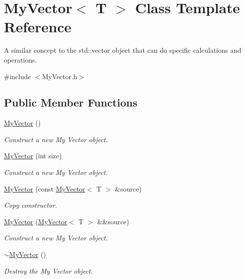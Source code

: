 \hypertarget{class_my_vector}{}\section{My\+Vector$<$ T $>$ Class Template Reference}
\label{class_my_vector}


A similar concept to the std\+::vector object that can do specific calculations and operations.  




{\ttfamily \#include $<$My\+Vector.\+h$>$}

\subsection*{Public Member Functions}
\begin{DoxyCompactItemize}
\item 
\mbox{\hyperlink{class_my_vector_ac356762c5ced52c0d934476cef32e472}{My\+Vector}} ()
\begin{DoxyCompactList}\small\item\em Construct a new My Vector object. \end{DoxyCompactList}\item 
\mbox{\hyperlink{class_my_vector_a9f780e2c6c6f35610a656b64395c6d1b}{My\+Vector}} (int size)
\begin{DoxyCompactList}\small\item\em Construct a new My Vector object. \end{DoxyCompactList}\item 
\mbox{\hyperlink{class_my_vector_aaf93995f4a267cc279867c10cfbef623}{My\+Vector}} (const \mbox{\hyperlink{class_my_vector}{My\+Vector}}$<$ T $>$ \&source)
\begin{DoxyCompactList}\small\item\em Copy constructor. \end{DoxyCompactList}\item 
\mbox{\hyperlink{class_my_vector_a7b2d4483f19b1ea3525e49336c857111}{My\+Vector}} (\mbox{\hyperlink{class_my_vector}{My\+Vector}}$<$ T $>$ \&\&source)
\begin{DoxyCompactList}\small\item\em Construct a new My Vector object. \end{DoxyCompactList}\item 
\mbox{\hyperlink{class_my_vector_abe59f181259ff63fa583f4bd87a9737e}{$\sim$\+My\+Vector}} ()
\begin{DoxyCompactList}\small\item\em Destroy the My Vector object. \end{DoxyCompactList}\item 

\end{DoxyCompactItemize}
